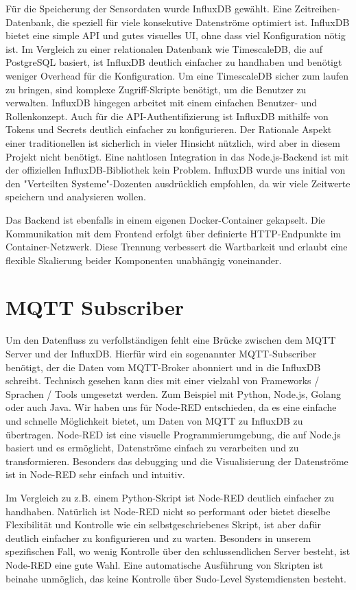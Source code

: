 Für die Speicherung der Sensordaten wurde InfluxDB gewählt. 
Eine Zeitreihen-Datenbank, die speziell für viele konsekutive Datenströme optimiert ist. 
InfluxDB bietet eine simple API und gutes visuelles UI, ohne dass viel Konfiguration nötig ist.
Im Vergleich zu einer relationalen Datenbank wie TimescaleDB, die auf PostgreSQL basiert,
ist InfluxDB deutlich einfacher zu handhaben und benötigt weniger Overhead für die Konfiguration.
Um eine TimescaleDB sicher zum laufen zu bringen, sind komplexe Zugriff-Skripte benötigt, um die Benutzer zu verwalten.
InfluxDB hingegen arbeitet mit einem einfachen Benutzer- und Rollenkonzept. 
Auch für die API-Authentifizierung ist InfluxDB mithilfe von Tokens und Secrets deutlich einfacher zu konfigurieren.
Der Rationale Aspekt einer traditionellen ist sicherlich in vieler Hinsicht nützlich, wird aber in diesem Projekt nicht benötigt.
Eine nahtlosen Integration in das Node.js-Backend ist mit der offiziellen InfluxDB-Bibliothek kein Problem.
InfluxDB wurde uns initial von den "Verteilten Systeme"-Dozenten ausdrücklich empfohlen, da wir viele Zeitwerte speichern und analysieren wollen.

Das Backend ist ebenfalls in einem eigenen Docker-Container gekapselt. 
Die Kommunikation mit dem Frontend erfolgt über definierte HTTP-Endpunkte im Container-Netzwerk. 
Diese Trennung verbessert die Wartbarkeit und erlaubt eine flexible Skalierung beider Komponenten unabhängig voneinander.

\section{MQTT Subscriber}
Um den Datenfluss zu verfollständigen fehlt eine Brücke zwischen dem MQTT Server und der InfluxDB. 
Hierfür wird ein sogenannter MQTT-Subscriber benötigt, der die Daten vom MQTT-Broker abonniert und in die InfluxDB schreibt.
Technisch gesehen kann dies mit einer vielzahl von Frameworks / Sprachen / Tools umgesetzt werden. 
Zum Beispiel mit Python, Node.js, Golang oder auch Java.
Wir haben uns für Node-RED entschieden, da es eine einfache und schnelle Möglichkeit bietet, um Daten von MQTT zu InfluxDB zu übertragen.
Node-RED ist eine visuelle Programmierumgebung, die auf Node.js basiert und es ermöglicht, Datenströme einfach zu verarbeiten und zu transformieren.
Besonders das debugging und die Visualisierung der Datenströme ist in Node-RED sehr einfach und intuitiv.
\cite{nodered2023docs}

Im Vergleich zu z.B. einem Python-Skript ist Node-RED deutlich einfacher zu handhaben.
Natürlich ist Node-RED nicht so performant oder bietet dieselbe Flexibilität und Kontrolle wie ein selbstgeschriebenes Skript,
ist aber dafür deutlich einfacher zu konfigurieren und zu warten.
Besonders in unserem spezifischen Fall, wo wenig Kontrolle über den schlussendlichen Server besteht, ist Node-RED eine gute Wahl.
Eine automatische Ausführung von Skripten ist beinahe unmöglich, das keine Kontrolle über Sudo-Level Systemdiensten besteht.


